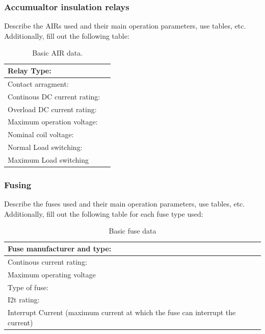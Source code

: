 \subsubsection{Accumualtor insulation relays}
Describe the AIRs used and their main operation parameters, use tables, etc.
Additionally, fill out the following table:

\begin{table}[H]
	\centering
	\caption{Basic AIR data.}
	\begin{tabularx}{\textwidth}{|X|X|}
		\hline
		Relay Type: &  \\[\TableSize]
		\hline
		Contact arragment: &  \\[\TableSize]
		\hline
		Continous DC current rating: &  \\[\TableSize]
		\hline
		Overload DC current rating:  &  \\[\TableSize]
		\hline
		Maximum operation voltage: &  \\[\TableSize]
		\hline
		Nominal coil voltage: &  \\[\TableSize]
		\hline
		Normal Load switching: & \\[\TableSize]
		\hline
		Maximum Load switching &  \\[\TableSize]
		\hline
	\end{tabularx}%
	\label{tab:acc-air}%
\end{table}%

\subsubsection{Fusing}
Describe the fuses used and their main operation parameters, use tables, etc.
Additionally, fill out the following table for each fuse type used:

\begin{table}[H]
	\centering
	\caption{Basic fuse data}
	\begin{tabularx}{\textwidth}{|X|X|}
		\hline
		Fuse manufacturer and type: &  \\[\TableSize]
		\hline
		Continous current rating:  &  \\[\TableSize]
		\hline
		Maximum operating voltage  &  \\[\TableSize]
		\hline
		Type of fuse: &  \\[\TableSize]
		\hline
		I2t rating: &  \\[\TableSize]
		\hline
		Interrupt Current (maximum current at which the fuse can interrupt the current) &  \\[\TableSize]
		\hline
	\end{tabularx}%
	\label{tab:acc-fuse}%
\end{table}%

